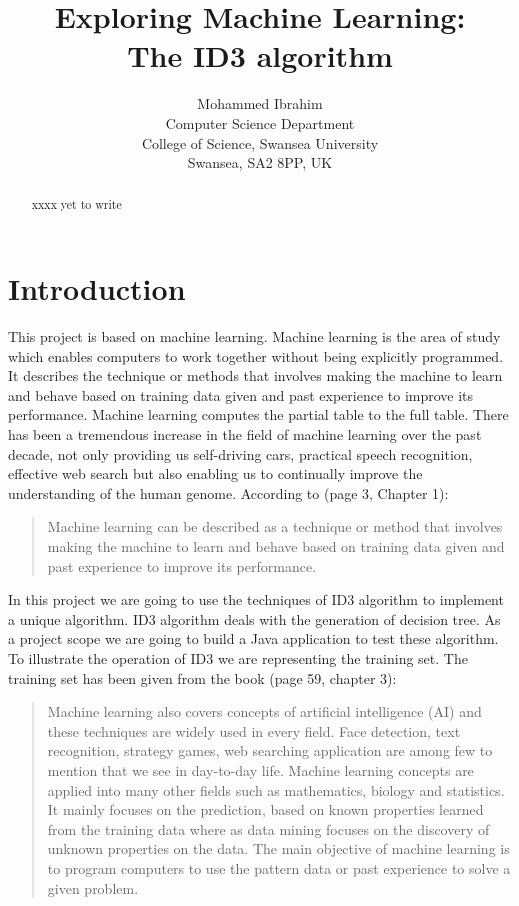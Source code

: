 \documentclass{article}
\begin{document}
\title{Exploring Machine Learning:\\
  The ID3 algorithm}

\author{Mohammed Ibrahim\\
 Computer Science Department\\
  College of Science, Swansea University\\
  Swansea, SA2 8PP, UK
}

\maketitle
\begin{abstract}
xxxx yet to write
\end{abstract}
\pagebreak
\tableofcontents
\pagebreak
\section{Introduction}
\label{sec:int}

This project is based on machine learning. Machine learning is the area of study which enables computers to work together without being explicitly programmed. It describes the technique or methods that involves making the machine to learn and behave based on training data given and past experience to improve its performance. Machine learning computes the partial table to the full table.
There has been a tremendous increase in the field of machine learning over the past decade, not only providing us self-driving cars, practical speech recognition,  effective web search but also enabling us to continually improve the understanding of the human genome. According to \cite{Alpaydin2010MachineLearning}(page 3, Chapter 1):
\begin{quote}
  Machine learning can be described as a technique or method that involves making the machine to learn and behave based on training data given and past experience to improve its performance. 
\end{quote}
In this project we are going to use the techniques of ID3 algorithm to implement a unique algorithm. ID3 algorithm deals with the generation of decision tree. As a project scope we are going to build a Java application to test these algorithm. To illustrate the operation of ID3 we are representing the training set. 
The training set has been given from the book \cite{Mitchell1997MachineLearning}(page 59, chapter 3):
\begin{quote}
  Machine learning also covers concepts of artificial intelligence (AI) and these techniques are widely used in every field. Face detection, text recognition, strategy games, web searching application are among few to mention that we see in day-to-day life. Machine learning concepts are applied into many other fields such as mathematics, biology and statistics. It mainly focuses on the prediction, based on known properties learned from the training data where as data mining focuses on the discovery of unknown properties on the data.
The main objective of machine learning is to program computers to use the pattern data or past experience to solve a given problem.
\end{quote}
\end{document}
